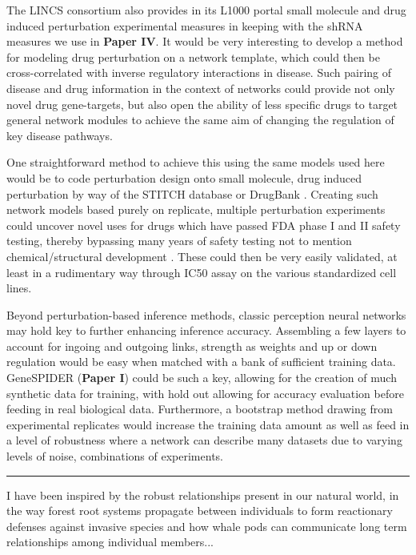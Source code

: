 The LINCS consortium also provides in its L1000 portal small molecule and drug induced perturbation experimental measures in keeping with the shRNA measures we use in \textbf{Paper IV}. It would be very interesting to develop a method for modeling drug perturbation on a network template, which could then be cross-correlated with inverse regulatory interactions in disease. Such pairing of disease and drug information in the context of networks could provide not only novel drug gene-targets, but also open the ability of less specific drugs to target general network modules to achieve the same aim of changing the regulation of key disease pathways.

One straightforward method to achieve this using the same models used here would be to code perturbation design onto small molecule, drug induced perturbation by way of the STITCH database \citep{kuhn2009stitch} or DrugBank \citep{wishart2006drugbank}. Creating such network models based purely on replicate, multiple perturbation experiments could uncover novel uses for drugs which have passed FDA phase I and II safety testing, thereby bypassing many years of safety testing not to mention chemical/structural development \citep{oprea2011drug}. These could then be very easily validated, at least in a rudimentary way through IC50 assay on the various standardized cell lines.

Beyond perturbation-based inference methods, classic perception neural networks may hold key to further enhancing inference accuracy. Assembling a few layers to account for ingoing and outgoing links, strength as weights and up or down regulation would be easy when matched with a bank of sufficient training data. GeneSPIDER (\textbf{Paper I}) could be such a key, allowing for the creation of much synthetic data for training, with hold out allowing for accuracy evaluation before feeding in real biological data. Furthermore, a bootstrap method drawing from experimental replicates would increase the training data amount as well as feed in a level of robustness where a network can describe many datasets due to varying levels of noise, combinations of experiments.

\noindent\rule{12cm}{0.4pt}

I have been inspired by the robust relationships present in our natural world, in the way forest root systems propagate between individuals to form reactionary defenses against invasive species and how whale pods can communicate long term relationships among individual members...\\




